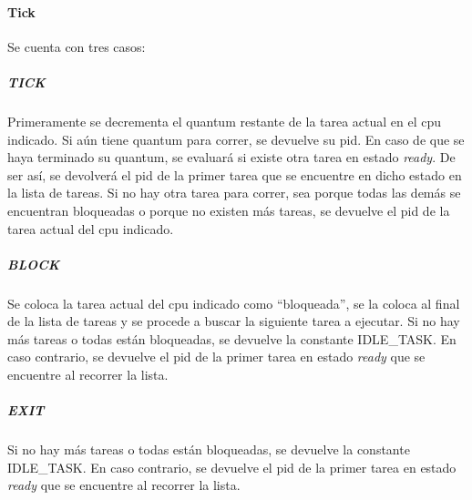 \paragraph{Tick} Se cuenta con tres casos:

\subparagraph{TICK} Primeramente se decrementa el quantum restante de la tarea actual en el cpu indicado.  Si aún tiene quantum para correr, se devuelve su pid.  En caso de que se haya terminado su quantum, se evaluará si existe otra tarea en estado {\it ready}.  De ser así, se devolverá el pid de la primer tarea que se encuentre en dicho estado en la lista de tareas.  Si no hay otra tarea para correr, sea porque todas las demás se encuentran bloqueadas o porque no existen más tareas, se devuelve el pid de la tarea actual del cpu indicado.
\subparagraph{BLOCK} Se coloca la tarea actual del cpu indicado como ``bloqueada'', se la coloca al final de la lista de tareas y se procede a buscar la siguiente tarea a ejecutar.  Si no hay más tareas o todas están bloqueadas, se devuelve la constante IDLE_TASK.  En caso contrario, se devuelve el pid de la primer tarea en estado {\it ready} que se encuentre al recorrer la lista.
\subparagraph{EXIT} Si no hay más tareas o todas están bloqueadas, se devuelve la constante IDLE_TASK.  En caso contrario, se devuelve el pid de la primer tarea en estado {\it ready} que se encuentre al recorrer la lista.
